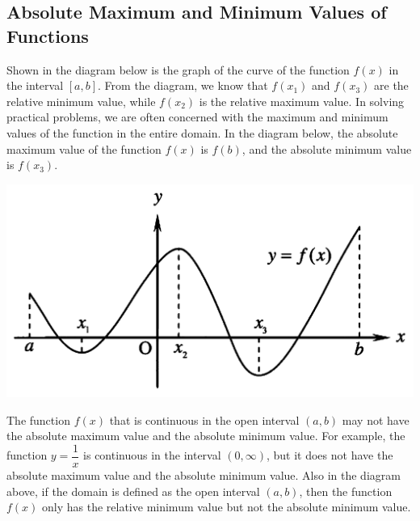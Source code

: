 \documentclass{report}
\begin{document}
\subsection{Absolute Maximum and Minimum Values of Functions}

Shown in the diagram below is the graph of the curve of the function $f(x)$ in
the interval $[a, b]$. From the diagram, we know that $f(x_1)$ and $f(x_3)$ are
the relative minimum value, while $f(x_2)$ is the relative maximum value. In
solving practical problems, we are often concerned with the maximum and minimum
values of the function in the entire domain. In the diagram below, the absolute
maximum value of the function $f(x)$ is $f(b)$, and the absolute minimum value
is $f(x_3)$.
\begin{center}
    \includegraphics[scale=0.25]{assets/26-8.png}
\end{center}

\begin{center}
\end{center}

The function $f(x)$ that is continuous in the open interval $(a, b)$ may not
have the absolute maximum value and the absolute minimum value. For example,
the function $y = \dfrac{1}{x}$ is continuous in the interval $(0, \infty)$,
but it does not have the absolute maximum value and the absolute minimum value.
Also in the diagram above, if the domain is defined as the open interval $(a,
    b)$, then the function $f(x)$ only has the relative minimum value but not the
absolute minimum value.
\end{document}

